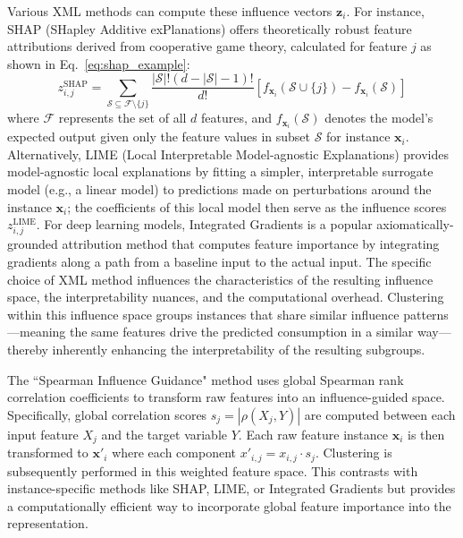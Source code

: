 \documentclass[final,authoryear,3p,times,review,sort&compress]{elsarticle}
\newcommand{\vect}[1]{\mathbf{#1}}
\newcommand{\set}[1]{\mathcal{#1}}
\begin{document}
Various XML methods can compute these influence vectors $\vect{z}_i$. For instance, SHAP (SHapley Additive exPlanations) \citep{antwarg2021explaining} offers theoretically robust feature attributions derived from cooperative game theory, calculated for feature $j$ as shown in Eq.~\ref{eq:shap_example}:
\begin{equation} \label{eq:shap_example}
    z_{i,j}^{\text{SHAP}} = \sum_{\set{S} \subseteq \set{F}\setminus\{j\}} \frac{|\set{S}|!(d-|\set{S}|-1)!}{d!}[f_{\vect{x}_i}(\set{S} \cup \{j\}) - f_{\vect{x}_i}(\set{S})]
\end{equation}
where $\set{F}$ represents the set of all $d$ features, and $f_{\vect{x}_i}(\set{S})$ denotes the model's expected output given only the feature values in subset $\set{S}$ for instance $\vect{x}_i$. Alternatively, LIME (Local Interpretable Model-agnostic Explanations) \citep{mishra2017local} provides model-agnostic local explanations by fitting a simpler, interpretable surrogate model (e.g., a linear model) to predictions made on perturbations around the instance $\vect{x}_i$; the coefficients of this local model then serve as the influence scores $z_{i,j}^{\text{LIME}}$. For deep learning models, Integrated Gradients \citep{sundararajan2017gradients} is a popular axiomatically-grounded attribution method that computes feature importance by integrating gradients along a path from a baseline input to the actual input. The specific choice of XML method influences the characteristics of the resulting influence space, the interpretability nuances, and the computational overhead. Clustering within this influence space groups instances that share similar influence patterns—meaning the same features drive the predicted consumption in a similar way—thereby inherently enhancing the interpretability of the resulting subgroups.

The ``Spearman Influence Guidance" method uses global Spearman rank correlation coefficients to transform raw features into an influence-guided space. Specifically, global correlation scores $s_j = |\rho(X_j, Y)|$ are computed between each input feature $X_j$ and the target variable $Y$. Each raw feature instance $\vect{x}_i$ is then transformed to $\vect{x}'_i$ where each component $x'_{i,j} = x_{i,j} \cdot s_j$. Clustering is subsequently performed in this weighted feature space. This contrasts with instance-specific methods like SHAP, LIME, or Integrated Gradients but provides a computationally efficient way to incorporate global feature importance into the representation.
\end{document}
